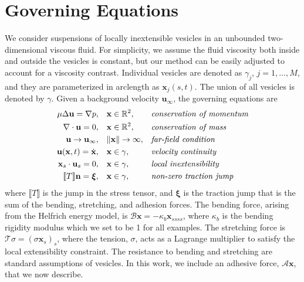 \documentclass[prf,superscriptaddress,showpacs]{revtex4-1}
\renewcommand{\AA}{\mathcal{A}}
\newcommand{\BB}{\mathcal{B}}
\newcommand{\nn}{\mathbf{n}}
\newcommand{\RR}{\mathbb{R}}
\newcommand{\TT}{\mathcal{T}}
\newcommand{\uu}{\mathbf{u}}
\newcommand{\xx}{\mathbf{x}}
\newcommand{\xxi}{\boldsymbol{\xi}}
\begin{document}
\section{Governing Equations \label{sec:ge}}
We consider suspensions of locally inextensible vesicles in an unbounded
two-dimensional viscous fluid.  For simplicity, we assume the fluid
viscosity both inside and outside the vesicles is constant, but our
method can be easily adjusted to account for a viscosity contrast.
Individual vesicles are denoted as $\gamma_j$, $j=1,\ldots,M$, and they
are parameterized in arclength as $\xx_j(s,t)$.  The union of all
vesicles is denoted by $\gamma$.  Given a background velocity
$\uu_\infty$, the governing equations are
\begin{equation*}
\begin{aligned}
  \mu \Delta \uu = \nabla p, \quad &\xx \in \RR^2,
    &&\mbox{\em conservation of momentum} \\
  \nabla \cdot \uu = 0, \quad &\xx \in \RR^2, 
    &&\mbox{\em conservation of mass} \\
  \uu \rightarrow \uu_\infty, \quad &\|\xx\| \rightarrow \infty,
    &&\mbox{\em far-field condition} \\
  \uu(\xx,t) = \dot{\xx}, \quad &\xx \in \gamma,
    &&\mbox{\em velocity continuity} \\
  \xx_s \cdot \uu_s =0, \quad &\xx \in \gamma,
    &&\mbox{\em local inextensibility} \\
  \llbracket T \rrbracket \nn = \xxi, \quad &\xx \in \gamma,
    &&\mbox{\em non-zero traction jump}
\end{aligned}
\end{equation*}
where $\llbracket T \rrbracket$ is the jump in the stress tensor, and
$\xxi$ is the traction jump that is the sum of the bending, stretching,
and adhesion forces.  The bending force, arising from the Helfrich
energy model, is $\BB \xx = -\kappa_b \xx_{ssss}$, where $\kappa_b$ is
the bending rigidity modulus which we set to be 1 for all examples. The
stretching force is $\TT \sigma = (\sigma \xx_s)_s$, where the tension,
$\sigma$, acts as a Lagrange multiplier to satisfy the local
extensibility constraint.  The resistance to bending and stretching are
standard assumptions of vesicles.  In this work, we include an adhesive
force, $\AA \xx$, that we now describe.

\end{document}
